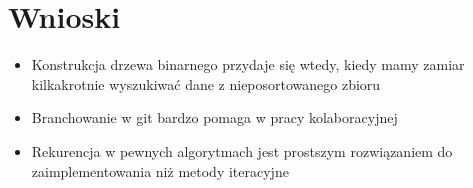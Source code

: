 	\newpage
\section{Wnioski}	%

\begin{itemize}
	\item Konstrukcja drzewa binarnego przydaje się wtedy, kiedy mamy zamiar kilkakrotnie wyszukiwać dane z nieposortowanego zbioru
	
	\item Branchowanie w git bardzo pomaga w pracy kolaboracyjnej
	
	\item Rekurencja w pewnych algorytmach jest prostszym rozwiązaniem do zaimplementowania niż metody iteracyjne
\end{itemize}

